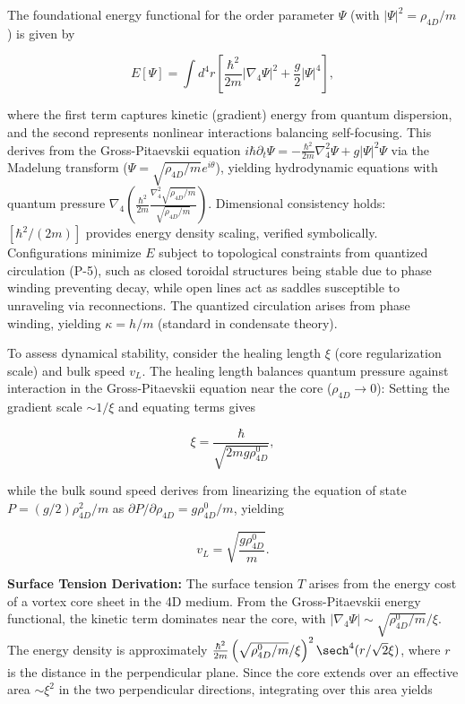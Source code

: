 The foundational energy functional for the order parameter $\Psi$ (with $|\Psi|^2 = \rho_{4D}/m$) is given by

\begin{equation}
E[\Psi] = \int d^4 r \left[ \frac{\hbar^2}{2m} |\nabla_4 \Psi|^2 + \frac{g}{2} |\Psi|^4 \right],
\end{equation}

where the first term captures kinetic (gradient) energy from quantum dispersion, and the second represents nonlinear interactions balancing self-focusing. This derives from the Gross-Pitaevskii equation $i \hbar \partial_t \Psi = -\frac{\hbar^2}{2 m} \nabla_4^2 \Psi + g |\Psi|^2 \Psi$ via the Madelung transform ($\Psi = \sqrt{\rho_{4D}/m} e^{i \theta}$), yielding hydrodynamic equations with quantum pressure $\nabla_4 \left( \frac{\hbar^2}{2 m} \frac{\nabla_4^2 \sqrt{\rho_{4D}/m}}{\sqrt{\rho_{4D}/m}} \right)$. Dimensional consistency holds: $[\hbar^2 / (2m)]$ provides energy density scaling, verified symbolically. Configurations minimize $E$ subject to topological constraints from quantized circulation (P-5), such as closed toroidal structures being stable due to phase winding preventing decay, while open lines act as saddles susceptible to unraveling via reconnections. The quantized circulation arises from phase winding, yielding $\kappa = h / m$ (standard in condensate theory).

To assess dynamical stability, consider the healing length $\xi$ (core regularization scale) and bulk speed $v_L$. The healing length balances quantum pressure against interaction in the Gross-Pitaevskii equation near the core ($\rho_{4D} \to 0$): Setting the gradient scale $\sim 1/\xi$ and equating terms gives

\begin{equation}
\xi = \frac{\hbar}{\sqrt{2 m g \rho_{4D}^0}},
\end{equation}

while the bulk sound speed derives from linearizing the equation of state $P = (g/2) \rho_{4D}^2 / m$ as $\partial P / \partial \rho_{4D} = g \rho_{4D}^0 / m$, yielding

\begin{equation}
v_L = \sqrt{\frac{g \rho_{4D}^0}{m}}.
\end{equation}

\textbf{Surface Tension Derivation:} The surface tension $T$ arises from the energy cost of a vortex core sheet in the 4D medium. From the Gross-Pitaevskii energy functional, the kinetic term dominates near the core, with $|\nabla_4 \Psi| \sim \sqrt{\rho_{4D}^0 / m} / \xi$. The energy density is approximately $\frac{\hbar^2}{2m} \left( \sqrt{\rho_{4D}^0 / m} / \xi \right)^2 \sech^4(r / \sqrt{2} \xi)$, where $r$ is the distance in the perpendicular plane. Since the core extends over an effective area $\sim \xi^2$ in the two perpendicular directions, integrating over this area yields

